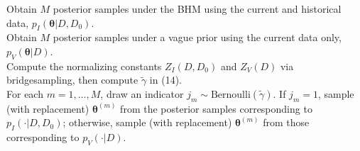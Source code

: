 \documentclass{standalone}
\newcommand{\pkg}[1]{#1}
\newcommand{\CRANpkg}[1]{\pkg{#1}}%
\begin{document}
\nopagecolor
\begin{algorithm}[H]
  \SetAlgoLined
  Obtain $M$ posterior samples under the BHM using the current and historical data, $p_{I}(\bm{\theta} | D, D_0)$.
  \\ Obtain $M$ posterior samples under a vague prior using the current data only, $p_V(\bm{\theta} | D)$.
  \\ Compute the normalizing constants $Z_I(D, D_0)$ and $Z_V(D)$ via \CRANpkg{bridgesampling}, then compute $\tilde{\gamma}$ in (14).
  \\ For each $m = 1, \ldots, M$, draw an indicator $j_m \sim \text{Bernoulli}(\tilde{\gamma})$. If $j_m = 1$, sample (with replacement) $\bm{\theta}^{(m)}$ from the posterior samples corresponding to $p_I(\cdot | D, D_0)$; otherwise, sample (with replacement) $\bm{\theta}^{(m)}$ from those corresponding to $p_V(\cdot | D)$.
\end{algorithm}
\end{document}
